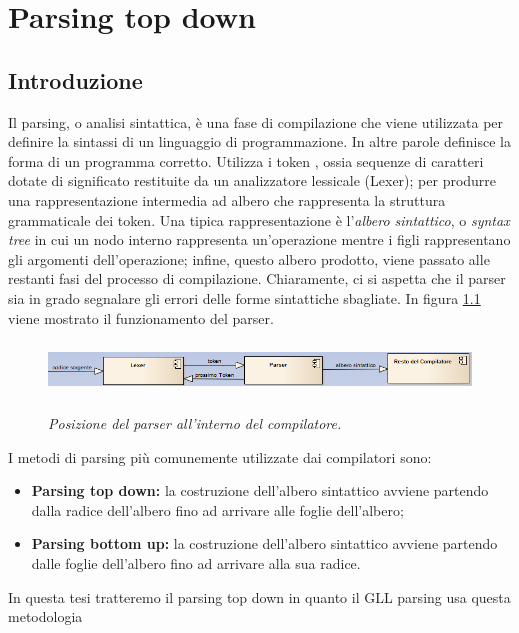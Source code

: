 \chapter{Parsing top down}
\section{Introduzione}
Il parsing, o analisi sintattica, è una fase di compilazione  che viene utilizzata per definire la sintassi di un linguaggio di programmazione. In altre parole definisce la forma di un programma corretto. Utilizza i token \cite{libro: compilatori}, ossia sequenze di caratteri dotate di significato restituite da un analizzatore lessicale (Lexer); per produrre una rappresentazione intermedia ad albero che rappresenta la struttura grammaticale dei token. Una tipica rappresentazione è l'\textit{albero sintattico}, o \textit{syntax tree} in cui un nodo interno rappresenta un'operazione mentre i figli rappresentano gli argomenti dell'operazione; infine, questo albero prodotto, viene passato alle restanti fasi del processo di compilazione. Chiaramente, ci si aspetta che il parser sia in grado segnalare gli errori delle forme sintattiche sbagliate. In figura \ref{figParser} viene mostrato il funzionamento del parser.
\par
\vspace{0.5mm}
\begin{figure}[hbpb]\label{figParser}
	{\includegraphics[height=40pt,width=420pt,scale=0.1]{parser.png}}
	\caption{\textit{Posizione del parser all'interno del compilatore.}}
\end{figure}
I metodi di parsing più comunemente utilizzate dai compilatori sono:
\begin{itemize}
	\item \textbf{Parsing top down: }la costruzione dell'albero sintattico avviene partendo dalla radice dell'albero fino ad arrivare alle foglie dell'albero;
	\item \textbf{Parsing bottom up: }la costruzione dell'albero sintattico avviene partendo dalle foglie dell'albero fino ad arrivare alla sua radice.
\end{itemize}
In questa tesi tratteremo il parsing top down in quanto il GLL parsing usa questa metodologia
